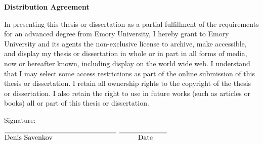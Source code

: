 \documentclass[11pt]{report}
\begin{document}
\renewcommand{\baselinestretch}{1.3}




\begin{titlepage}
\vspace{2.5in}
%
%
\noindent
{\bf Distribution Agreement}

\vspace{0.25in}

\noindent
In presenting this thesis or dissertation as a
partial fulfillment of the requirements for an advanced
degree from Emory University, I hereby grant to
Emory University and its agents the non-exclusive
license to archive, make accessible, and display
my thesis or dissertation in whole or in part in all
forms of media, now or hereafter known, including
display on the world wide web.  I understand
that I may select some access restrictions as part
of the online submission of this thesis or
dissertation.  I retain all ownership rights to the
copyright of the thesis or dissertation.  I also retain
the right to use in future works (such as articles or
books) all or part of this thesis or dissertation.

\vspace{ 1.0in}

\noindent
Signature:

\vspace{0.35in}

\noindent
$\overline{\strut{\mbox{\myname}} \ \ \ \ \ \ \ \ \ \ \ \ \ \ \ \ \ \ \ \ \ \ \ \ \ \ \ }$
\hspace{0.5625in}
$\overline{\strut\ \ \ \ \ \ \ \ {\mbox{Date}}\ \ \ \ \ \ }$
\end{titlepage}

\end{document}
